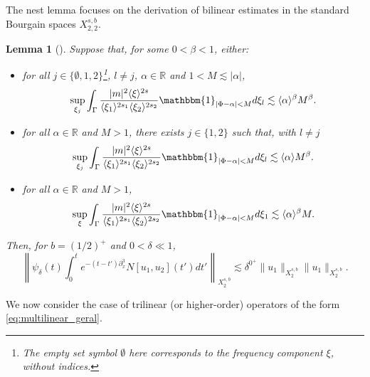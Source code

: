 \documentclass[%
11pt,  reqno]{amsart}
\newcommand{\jap}[1]{\langle #1 \rangle}
\newcommand{\5}{\textup{V}}
\newtheorem{lemma}[theorem]{Lemma}
\theoremstyle{remark}
\newcommand{\R}{\mathbb{R}}
\numberwithin{equation}{section}
\numberwithin{theorem}{section}
\begin{document}
{		The nest lemma focuses on the derivation of bilinear estimates in the standard Bourgain spaces $X^{s,b}_{2,2}$.
		
		\begin{lemma}[{\cite[Lemma 3.1]{CLS}}]\label{lem:fre_bi}
			Suppose that, for some $0<\beta<1$, either:
			\begin{itemize}
				\item for all $j\in\{\emptyset,1,2\}$\footnote{The empty set symbol $\emptyset$ here corresponds to the frequency component $\xi$, without indices.}, $l\neq j$, $\alpha\in \R$ and $1<M\lesssim |\alpha|$,
				\begin{equation}\label{eq:frequad}
					\sup_{\xi_j}\int_\Gamma \frac{|m|^2\jap{\xi}^{2s}}{\jap{\xi_{1}}^{2s_1}\jap{\xi_{2}}^{2s_2}}\mathbbm{1}_{|\Phi-\alpha|<M} d\xi_{l} \lesssim \jap{\alpha}^\beta M^\beta.
				\end{equation}
				\item for all $\alpha\in \R$ and $M>1$, there exists $j\in\{1,2\}$ such that, with $l\neq j$
				\begin{equation}\label{eq:frequad2}
					\sup_{\xi_j}\int_\Gamma \frac{|m|^2\jap{\xi}^{2s}}{\jap{\xi_{1}}^{2s_1}\jap{\xi_{2}}^{2s_2}}\mathbbm{1}_{|\Phi-\alpha|<M} d\xi_{l}  \lesssim \jap{\alpha} M^\beta.
				\end{equation}
				\item for all $\alpha\in \R$ and $M>1$,
				\begin{equation}\label{eq:frequad3}
					\sup_{\xi}\int_\Gamma \frac{|m|^2\jap{\xi}^{2s}}{\jap{\xi_{1}}^{2s_1}\jap{\xi_{2}}^{2s_2}}\mathbbm{1}_{|\Phi-\alpha|<M} d\xi_{1}  \lesssim \jap{\alpha}^\beta M.
				\end{equation}
			\end{itemize}
			Then, for $b=(1/2)^+$ and $0<\delta\ll 1$,
			\begin{equation}
				\left\|\psi_\delta(t)\int_0^te^{-(t-t')\partial_x^3} N[u_1,u_2](t')dt'\right\|_{X^{s,b}_{2}} \lesssim \delta^{0^+}\|u_1\|_{X^{s,b}_{2}} \|u_1\|_{X^{s,b}_{2}}.
			\end{equation}
		\end{lemma}
		
		We now consider the case of trilinear (or higher-order) operators of the form \eqref{eq:multilinear_geral}.
		
}
\end{document}
